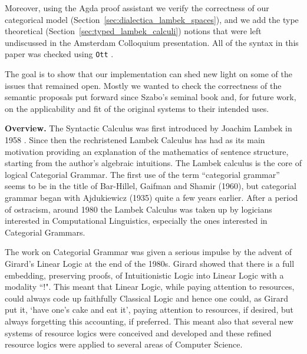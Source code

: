 \documentclass{llncs}
\begin{document}
Moreover, using the Agda proof assistant \cite{bove2009} we verify the
correctness of our categorical model
(Section~\ref{sec:dialectica_lambek_spaces}), and we add the type
theoretical (Section~\ref{sec:typed_lambek_calculi}) notions that were
left undiscussed in the Amsterdam Colloquium presentation.  All of the
syntax in this paper was checked using \texttt{Ott}
\cite{Sewell:2010}.

The goal is to show that our implementation can shed new light on some
of the issues that remained open.  Mostly we wanted to check the
correctness of the semantic proposals put forward since Szabo's
seminal book \cite{szabo1978} and, for future work, on the
applicability and fit of the original systems to their intended uses.

\textbf{Overview.} The Syntactic Calculus was first introduced by
Joachim Lambek in 1958 \cite{Lambek1958}. Since then the rechristened
Lambek Calculus has had as its main motivation providing an
explanation of the mathematics of sentence structure, starting from
the author's algebraic intuitions. The Lambek calculus is the core of
logical Categorial Grammar.  The first use of the term “categorial
grammar” seems to be in the title of Bar-Hillel, Gaifman and Shamir
(1960), but categorial grammar began with Ajdukiewicz (1935) quite a
few years earlier. After a period of ostracism, around 1980 the Lambek
Calculus was taken up by logicians interested in Computational
Linguistics, especially the ones interested in Categorial
Grammars. %

The work on Categorial Grammar was given a serious impulse by the
advent of Girard's Linear Logic  at the end of the 1980s.  Girard \cite{Girard:1987}
showed that there is a full embedding, preserving proofs, of
Intuitionistic Logic into Linear Logic with a modality ``!". This
meant that Linear Logic, while paying attention to resources, could
always code up faithfully Classical Logic and hence one could, as
Girard put it, `have one's cake and eat it', paying attention to
resources, if desired, but always forgetting this accounting, if
preferred. This meant also that several new
systems of resource logics were conceived and developed and these
refined resource logics were applied to several areas of Computer
Science.
\end{document}
